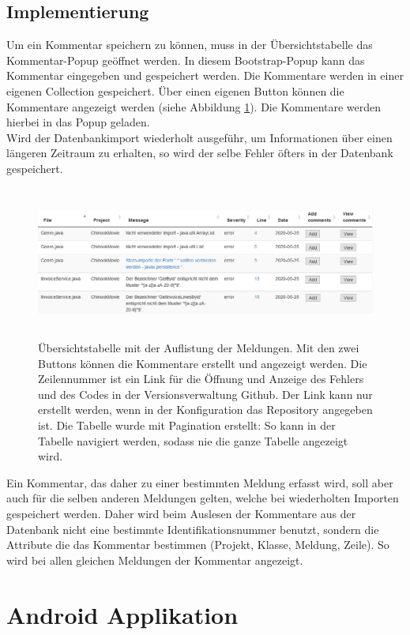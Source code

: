 \subsection{Implementierung}
Um ein Kommentar speichern zu können, muss in der Übersichtstabelle das Kommentar-Popup geöffnet werden. In diesem Bootstrap-Popup kann das Kommentar eingegeben und gespeichert werden. Die Kommentare werden in einer eigenen Collection gespeichert. Über einen eigenen Button können die Kommentare angezeigt werden (siehe Abbildung \ref{fig:popup}). Die Kommentare werden hierbei in das Popup geladen. \\ Wird der Datenbankimport wiederholt ausgeführ, um Informationen über einen längeren Zeitraum zu erhalten, so wird der selbe Fehler öfters in der Datenbank gespeichert.
\begin{figure}[tp]
  \centering
  \includegraphics[height=5cm]{images/table.PNG}
 \caption[Übersichtstabelle]{Übersichtstabelle mit der Auflistung der Meldungen. Mit den zwei Buttons können die Kommentare erstellt und angezeigt werden. Die Zeilennummer ist ein Link für die Öffnung und Anzeige des Fehlers und des Codes in der Versionsverwaltung Github. Der Link kann nur erstellt werden, wenn in der Konfiguration das Repository angegeben ist. Die Tabelle wurde mit Pagination erstellt: So kann in der Tabelle navigiert werden, sodass nie die ganze Tabelle angezeigt wird. }
  \label{fig:popup}
\end{figure}
Ein Kommentar, das daher zu einer bestimmten Meldung erfasst wird, soll aber auch für die selben anderen Meldungen gelten, welche bei wiederholten Importen gespeichert werden. Daher wird beim Auslesen der Kommentare aus der Datenbank nicht eine bestimmte Identifikationsnummer benutzt, sondern die Attribute die das Kommentar bestimmen (Projekt, Klasse, Meldung, Zeile). So wird bei allen gleichen Meldungen der Kommentar angezeigt.
\section{Android Applikation}
